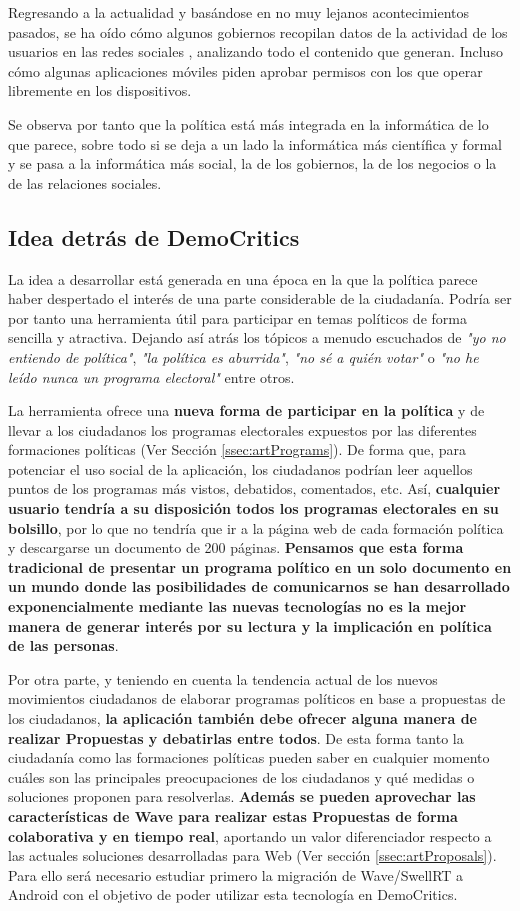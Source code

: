 	Regresando a la actualidad y basándose en no muy lejanos acontecimientos pasados, se ha oído cómo algunos gobiernos recopilan datos de la actividad de los usuarios en las redes sociales \cite{ref:NSAData}, analizando todo el contenido que generan. Incluso cómo algunas aplicaciones móviles piden aprobar permisos con los que operar libremente en los dispositivos.

	Se observa por tanto que la política está más integrada en la informática de lo que parece, sobre todo si se deja a un lado la informática más científica y formal y se pasa a la informática más social, la de los gobiernos, la de los negocios o la de las relaciones sociales.


	\subsection{Idea detrás de DemoCritics}

	La idea a desarrollar está generada en una época en la que la política parece haber despertado el interés de una parte considerable de la ciudadanía. Podría ser por tanto una herramienta útil para participar en temas políticos de forma sencilla y atractiva. Dejando así atrás los tópicos a menudo escuchados de \textit{"yo no entiendo de política"}, \textit{"la política es aburrida"}, \textit{"no sé a quién votar"} o \textit{"no he leído nunca un programa electoral"} entre otros.

	La herramienta ofrece una \textbf{nueva forma de participar en la política} y de llevar a los ciudadanos los programas electorales expuestos por las diferentes formaciones políticas (Ver Sección \ref{ssec:artPrograms}). De forma que, para potenciar el uso social de la aplicación, los ciudadanos podrían leer aquellos puntos de los programas más vistos, debatidos, comentados, etc. Así, \textbf{cualquier usuario tendría a su disposición todos los programas electorales en su bolsillo}, por lo que no tendría que ir a la página web de cada formación política y descargarse un documento de 200 páginas. \textbf{Pensamos que esta forma tradicional de presentar un programa político en un solo documento en un mundo donde las posibilidades de comunicarnos se han desarrollado exponencialmente mediante las nuevas tecnologías no es la mejor manera de generar interés por su lectura y la implicación en política de las personas}.

	Por otra parte, y teniendo en cuenta la tendencia actual de los nuevos movimientos ciudadanos de elaborar programas políticos en base a propuestas de los ciudadanos, \textbf{la aplicación también debe ofrecer alguna manera de realizar Propuestas y debatirlas entre todos}. De esta forma tanto la ciudadanía como las formaciones políticas pueden saber en cualquier momento cuáles son las principales preocupaciones de los ciudadanos y qué medidas o soluciones proponen para resolverlas. \textbf{Además se pueden aprovechar las características de Wave para realizar estas Propuestas de forma colaborativa y en tiempo real}, aportando un valor diferenciador respecto a las actuales soluciones desarrolladas para Web (Ver sección \ref{ssec:artProposals}). Para ello será necesario estudiar primero la migración de Wave/SwellRT a Android con el objetivo de poder utilizar esta tecnología en DemoCritics.

